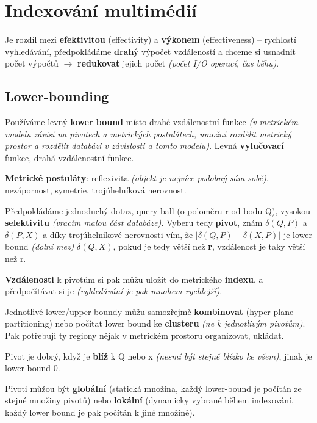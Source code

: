 \section{Indexování multimédií}

Je rozdíl mezi \textbf{efektivitou} (effectivity) a \textbf{výkonem} (effectiveness) -- rychlostí vyhledávání, předpokládáme \textbf{drahý} výpočet vzdáleností a chceme si usnadnit počet výpočtů $\to$ \textbf{redukovat} jejich počet \textit{(počet I/O operací, čas běhu)}.

\subsection{Lower-bounding}

Používáme levný \textbf{lower bound} místo drahé vzdálenostní funkce \textit{(v metrickém modelu závisí na pivotech a metrických postulátech, umožní rozdělit metrický prostor a rozdělit databázi v závislosti a tomto modelu)}. Levná \textbf{vylučovací} funkce, drahá vzdálenostní funkce.

\textbf{Metrické postuláty}: reflexivita \textit{(objekt je nejvíce podobný sám sobě)}, nezápornost, symetrie, trojúhelníková nerovnost.

Předpokládáme jednoduchý dotaz, query ball (o poloměru r od bodu Q), vysokou \textbf{selektivitu} \textit{(vracím malou část databáze)}. Vyberu tedy \textbf{pivot}, znám $\delta(Q, P)$ a $\delta(P, X)$ a díky trojúhelníkové nerovnosti vím, že $|\delta(Q, P) - \delta(X, P)|$ je lower bound \textit{(dolní mez)} $\delta(Q, X)$, pokud je tedy větší než \textbf{r}, vzdálenost je taky větší než r.

\textbf{Vzdálenosti} k pivotům si pak můžu uložit do metrického \textbf{indexu}, a předpočítávat si je \textit{(vyhledávání je pak mnohem rychlejší)}.

Jednotlivé lower/upper boundy můžu samozřejmě \textbf{kombinovat} (hyper-plane partitioning) nebo počítat lower bound ke \textbf{clusteru} \textit{(ne k jednotlivým pivotům)}. Pak potřebuji ty regiony nějak v metrickém prostoru organizovat, ukládat.

Pivot je dobrý, když je \textbf{blíž} k Q nebo x \textit{(nesmí být stejně blízko ke všem)}, jinak je lower bound 0.

Pivoti můžou být \textbf{globální} (statická množina, každý lower-bound je počítán ze stejné množiny pivotů) nebo \textbf{lokální} (dynamicky vybrané během indexování, každý lower bound je pak počítán k jiné množině).


